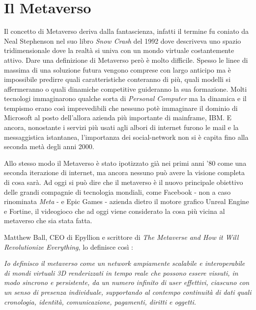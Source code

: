 


\section{Il Metaverso}

    Il concetto di Metaverso deriva dalla fantascienza, infatti il termine fu coniato da Neal Stephenson nel suo libro \textit{Snow Crash} del 1992 dove descriveva uno spazio tridimensionale dove la realtà si univa con un mondo virtuale costantemente attivo.
    Dare una definizione di Metaverso però è molto difficile.
    Spesso le linee di massima di una soluzione futura vengono comprese con largo anticipo ma è impossibile predirre quali caratteristiche conteranno di più, quali modelli si affermeranno o quali dinamiche competitive guideranno la sua formazione.
    Molti tecnologi immaginarono qualche sorta di \textit{Personal Computer} ma la dinamica e il tempismo erano così imprevedibili che nessuno potè immaginare il dominio di Microsoft al posto dell'allora azienda più importante di mainframe, IBM.
    E ancora, nonostante i servizi più usati agli albori di internet furono le mail e la messaggistica istantanea, l'importanza dei social-network non si è capita fino alla seconda metà degli anni 2000.
    
    Allo stesso modo il Metaverso è stato ipotizzato già nei primi anni '80 come una seconda iterazione di internet, ma ancora nessuno può avere la visione completa di cosa sarà. 
    Ad oggi si può dire che il metaverso è il nuovo principale obiettivo delle grandi compagnie di tecnologia mondiali, come Facebook - non a caso rinominata \textit{Meta} - e Epic Games - azienda dietro il motore grafico Unreal Engine e Fortine, il videogioco che ad oggi viene considerato la cosa più vicina al metaverso che sia stata fatta.

    Matthew Ball, CEO di Epyllion e scrittore di \textit{The Metaverse and How it Will Revolutionize Everything}, lo definisce così \cite{Ball2022}: 

    \begin{displayquote}
        \textit{Io definisco il metaverso come un network ampiamente scalabile e interoperabile di mondi virtuali 3D renderizzati in tempo reale che possono essere vissuti, in modo sincrono e persistente, da un numero infinito di user effettivi, ciascuno con un senso di presenza individuale, supportando al contempo continuità di dati quali cronologia, identità, comunicazione, pagamenti, diritti e oggetti.}
    \end{displayquote}

